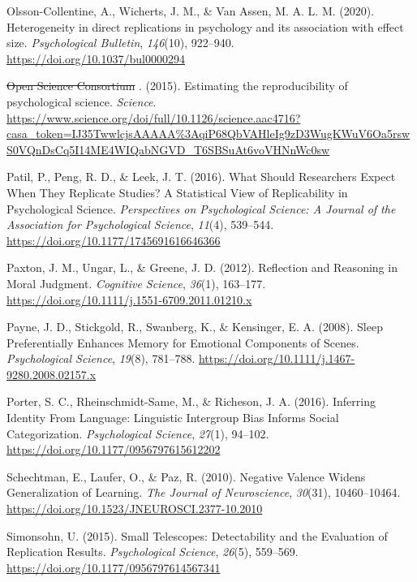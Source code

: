 \documentclass[
  english,
  a4paper,
]{article}
\newlength{\cslhangindent}
\newenvironment{CSLReferences}[2] %
{\begin{list}{}{%
			\setlength{\itemindent}{0pt}
			\setlength{\leftmargin}{0pt}
			\setlength{\parsep}{0pt}
			\ifodd #1
			\setlength{\leftmargin}{\cslhangindent}
			\setlength{\itemindent}{-1\cslhangindent}
			\fi
			\setlength{\itemsep}{#2\baselineskip}}}
	{\end{list}}
\providecommand{\DIFaddtex}[1]{{\protect\color{blue}\uwave{#1}}} %
\providecommand{\DIFdeltex}[1]{{\protect\color{red}\sout{#1}}}                      %
\providecommand{\DIFaddbegin}{} %
\providecommand{\DIFaddend}{} %
\providecommand{\DIFdelbegin}{} %
\providecommand{\DIFdelend}{} %
\providecommand{\DIFadd}[1]{\texorpdfstring{\DIFaddtex{#1}}{#1}} %
\providecommand{\DIFdel}[1]{\texorpdfstring{\DIFdeltex{#1}}{}} %
\newcommand{\DIFscaledelfig}{0.5}
\newlength{\DIFdelgraphicswidth} %
\newlength{\DIFdelgraphicsheight} %
\newcommand{\DIFaddincludegraphics}[2][]{{\color{blue}\fbox{\DIFOincludegraphics[#1]{#2}}}} %
\newcommand{\DIFdelincludegraphics}[2][]{%
\sbox{\DIFdelgraphicsbox}{\DIFOincludegraphics[#1]{#2}}%
\settoboxwidth{\DIFdelgraphicswidth}{\DIFdelgraphicsbox} %
\settoboxtotalheight{\DIFdelgraphicsheight}{\DIFdelgraphicsbox} %
\scalebox{\DIFscaledelfig}{%
\parbox[b]{\DIFdelgraphicswidth}{\usebox{\DIFdelgraphicsbox}\\[-\baselineskip] \rule{\DIFdelgraphicswidth}{0em}}\llap{\resizebox{\DIFdelgraphicswidth}{\DIFdelgraphicsheight}{%
\setlength{\unitlength}{\DIFdelgraphicswidth}%
\begin{picture}(1,1)%
\thicklines\linethickness{2pt} %
{\color[rgb]{1,0,0}\put(0,0){\framebox(1,1){}}}%
{\color[rgb]{1,0,0}\put(0,0){\line( 1,1){1}}}%
{\color[rgb]{1,0,0}\put(0,1){\line(1,-1){1}}}%
\end{picture}%
}\hspace*{3pt}}} %
} %
\DeclareRobustCommand{\DIFaddbegin}{\DIFOaddbegin \let\includegraphics\DIFaddincludegraphics} %
\DeclareRobustCommand{\DIFaddend}{\DIFOaddend \let\includegraphics\DIFOincludegraphics} %
\DeclareRobustCommand{\DIFdelbegin}{\DIFOdelbegin \let\includegraphics\DIFdelincludegraphics} %
\DeclareRobustCommand{\DIFdelend}{\DIFOaddend \let\includegraphics\DIFOincludegraphics} %
\begin{document}
\begin{CSLReferences}{1}{0}
\DIFaddend {}
Olsson-Collentine, A., Wicherts, J. M., \& Van Assen, M. A. L. M. (2020). Heterogeneity in direct replications in psychology and its association with effect size. \emph{Psychological Bulletin}, \emph{146}(10), 922--940. \url{https://doi.org/10.1037/bul0000294}

\DIFdelbegin {}
\DIFdel{Open Science Consortium}\DIFdelend \DIFaddbegin {}
\DIFadd{Open Science Collaboration}\DIFaddend . (2015). Estimating the reproducibility of psychological science. \emph{Science}. \url{https://www.science.org/doi/full/10.1126/science.aac4716?casa_token=IJ35TwwlcjsAAAAA\%3AqiP68QbVAHleIg9zD3WugKWuV6Oa5rswS0VQnDsCq5I14ME4WIQabNGVD_T6SBSuAt6voVHNnWc0sw}

Patil, P., Peng, R. D., \& Leek, J. T. (2016). What {Should Researchers Expect When They Replicate Studies}? {A Statistical View} of {Replicability} in {Psychological Science}. \emph{Perspectives on Psychological Science: A Journal of the Association for Psychological Science}, \emph{11}(4), 539--544. \url{https://doi.org/10.1177/1745691616646366}

Paxton, J. M., Ungar, L., \& Greene, J. D. (2012). Reflection and {Reasoning} in {Moral Judgment}. \emph{Cognitive Science}, \emph{36}(1), 163--177. \url{https://doi.org/10.1111/j.1551-6709.2011.01210.x}

Payne, J. D., Stickgold, R., Swanberg, K., \& Kensinger, E. A. (2008). Sleep {Preferentially Enhances Memory} for {Emotional Components} of {Scenes}. \emph{Psychological Science}, \emph{19}(8), 781--788. \url{https://doi.org/10.1111/j.1467-9280.2008.02157.x}

Porter, S. C., Rheinschmidt-Same, M., \& Richeson, J. A. (2016). Inferring {Identity From Language}: {Linguistic Intergroup Bias Informs Social Categorization}. \emph{Psychological Science}, \emph{27}(1), 94--102. \url{https://doi.org/10.1177/0956797615612202}

Schechtman, E., Laufer, O., \& Paz, R. (2010). Negative {Valence Widens Generalization} of {Learning}. \emph{The Journal of Neuroscience}, \emph{30}(31), 10460--10464. \url{https://doi.org/10.1523/JNEUROSCI.2377-10.2010}

Simonsohn, U. (2015). Small {Telescopes}: {Detectability} and the {Evaluation} of {Replication Results}. \emph{Psychological Science}, \emph{26}(5), 559--569. \url{https://doi.org/10.1177/0956797614567341}


\end{CSLReferences}
\end{document}

